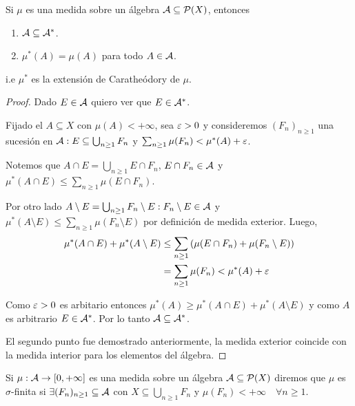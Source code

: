 \begin{corollary}
    Si \(\mu\) es una medida sobre un álgebra \(\mathcal{A} \subseteq \mathcal{P}(X)\), entonces \begin{enumerate}
        \item \(\mathcal{A} \subseteq \mathcal{A}^*\).
        \item \(\mu^*(A) = \mu(A)\) para todo \(A \in \mathcal{A}\).
    \end{enumerate}
    i.e \(\mu^*\) es la extensión de Caratheódory de \(\mu\).
    \begin{proof}
        Dado \(E \in \mathcal{A}\) quiero ver que \(E \in \mathcal{A}^*\).

        Fijado el \(A \subseteq X\) con \(\mu(A) < +\infty\), sea \(\varepsilon > 0\) y consideremos \((F_n)_{n \geq 1}\) una sucesión en \(\mathcal{A}
            : E \subseteq \bigcup_{n \geq 1} F_n\) y \(\sum_{n \geq 1} \mu(F_n) < \mu^*(A) + \varepsilon\).

        Notemos que \(A \cap E = \bigcup_{n \geq 1} E \cap F_n\), \(E \cap F_n \in \mathcal{A}\) y \(\mu^*(A \cap E) \leq \sum_{n \geq 1} \mu(E \cap F_n)\).

        Por otro lado \(A \setminus E = \bigcup_{n \geq 1} F_n \setminus E : F_n \setminus E \in \mathcal{A}\) y \(\mu^*(A \setminus E) \leq \sum_{n \geq 1} \mu(F_n \setminus E)\) por definición de medida exterior.
        Luego, \begin{align*}
            \mu^*(A \cap E) + \mu^*(A \setminus E) & \leq \sum_{n \geq 1} \left( \mu(E \cap F_n) + \mu(F_n \setminus E) \right) \\
                                                   & = \sum_{n \geq 1} \mu(F_n) < \mu^*(A) + \varepsilon                                 \\
        \end{align*}

        Como \(\varepsilon > 0\) es arbitario entonces \(\mu^*(A) \geq \mu^*(A \cap E) + \mu^*(A \setminus E)\) y como \(A\) es arbitrario \(E \in \mathcal{A}^*\).
        Por lo tanto \(\mathcal{A} \subseteq \mathcal{A}^*\).

        El segundo punto fue demostrado anteriormente, la medida exterior coincide con la medida interior para los elementos del álgebra.
    \end{proof}
\end{corollary}

\begin{definition}
    Si \(\mu : \mathcal{A} \to [0, +\infty]\) es una medida sobre un álgebra \(\mathcal{A} \subseteq \mathcal{P}(X)\) diremos que \(\mu\) es \(\sigma\)-finita si \(\exists (F_n)_{n \geq 1} \subseteq \mathcal{A}\) con \(X \subseteq \bigcup_{n \geq 1} F_n\) y \(\mu(F_n) < +\infty \quad \forall n \geq 1\).
\end{definition}

